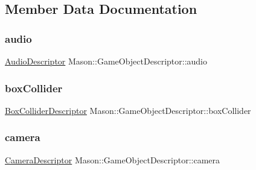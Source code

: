 \subsection{Member Data Documentation}
\hypertarget{class_mason_1_1_game_object_descriptor_a121843bc6264f0828e8672b1b390b21b}{}\label{class_mason_1_1_game_object_descriptor_a121843bc6264f0828e8672b1b390b21b} 
\subsubsection{\texorpdfstring{audio}{audio}}
{\footnotesize\ttfamily \hyperlink{class_mason_1_1_audio_descriptor}{Audio\+Descriptor} Mason\+::\+Game\+Object\+Descriptor\+::audio}

\hypertarget{class_mason_1_1_game_object_descriptor_a81952b9b181c5731b74971fb6510c838}{}\label{class_mason_1_1_game_object_descriptor_a81952b9b181c5731b74971fb6510c838} 
\subsubsection{\texorpdfstring{box\+Collider}{boxCollider}}
{\footnotesize\ttfamily \hyperlink{class_mason_1_1_box_collider_descriptor}{Box\+Collider\+Descriptor} Mason\+::\+Game\+Object\+Descriptor\+::box\+Collider}

\hypertarget{class_mason_1_1_game_object_descriptor_a9b2710a89f6a1bb223594a2762340414}{}\label{class_mason_1_1_game_object_descriptor_a9b2710a89f6a1bb223594a2762340414} 
\subsubsection{\texorpdfstring{camera}{camera}}
{\footnotesize\ttfamily \hyperlink{class_mason_1_1_camera_descriptor}{Camera\+Descriptor} Mason\+::\+Game\+Object\+Descriptor\+::camera}

\hypertarget{class_mason_1_1_game_object_descriptor_a1ece68a262a9eade1de5f470c1a84778}{}\label{class_mason_1_1_game_object_descriptor_a1ece68a262a9eade1de5f470c1a84778} 
